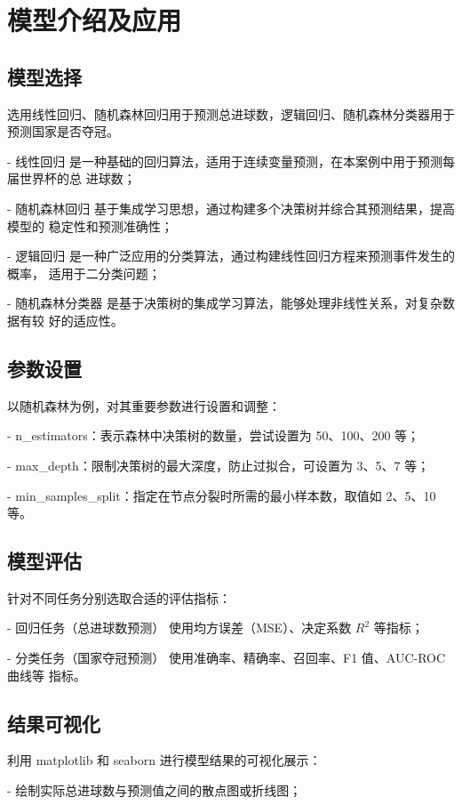 \documentclass[UTF8]{ctexart}
\begin{document}
	\section*{模型介绍及应用}
	
	\subsection*{模型选择}
	选用线性回归、随机森林回归用于预测总进球数，逻辑回归、随机森林分类器用于预测国家是否夺冠。
	
	
	- 线性回归 是一种基础的回归算法，适用于连续变量预测，在本案例中用于预测每届世界杯的总
	进球数；
	
	- 随机森林回归 基于集成学习思想，通过构建多个决策树并综合其预测结果，提高模型的
	稳定性和预测准确性；
	
	- 逻辑回归 是一种广泛应用的分类算法，通过构建线性回归方程来预测事件发生的概率，
	适用于二分类问题；
	
	- 随机森林分类器 是基于决策树的集成学习算法，能够处理非线性关系，对复杂数据有较
	好的适应性。
	
	
	\subsection*{参数设置}
	以随机森林为例，对其重要参数进行设置和调整：
	
	
	- n\_estimators：表示森林中决策树的数量，尝试设置为 50、100、200 等；
	
	- max\_depth：限制决策树的最大深度，防止过拟合，可设置为 3、5、7 等；
	
	- min\_samples\_split：指定在节点分裂时所需的最小样本数，取值如 2、5、10 等。
	
	
	\subsection*{模型评估}
	针对不同任务分别选取合适的评估指标：
	
	
	- 回归任务（总进球数预测） 使用均方误差（MSE）、决定系数 $R^2$ 等指标；
	
	- 分类任务（国家夺冠预测） 使用准确率、精确率、召回率、F1 值、AUC-ROC 曲线等
	指标。
	
	
	\subsection*{结果可视化}
	利用 matplotlib 和 seaborn 进行模型结果的可视化展示：
	
	
	- 绘制实际总进球数与预测值之间的散点图或折线图；
	
\end{document}
